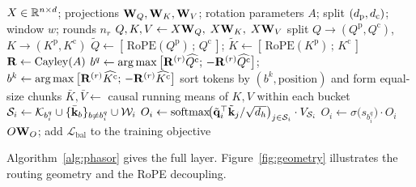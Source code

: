 \begin{algorithm}[t]
\caption{PHASOR attention (single head, causal)}
\label{alg:phasor}
\begin{algorithmic}[1]
\Require $X \in \mathbb{R}^{n\times d}$; projections $\mathbf{W}_Q,\mathbf{W}_K,\mathbf{W}_V$; rotation parameters $A$; split $(d_{\mathrm{p}},d_{\mathrm{c}})$; window $w$; rounds $n_r$
\State $Q, K, V \gets X\mathbf{W}_Q,\; X\mathbf{W}_K,\; X\mathbf{W}_V$
\State split $Q \to (Q^{\mathrm p}, Q^{\mathrm c})$, $K \to (K^{\mathrm p}, K^{\mathrm c})$ 
\State $\tilde Q \gets [\,\mathrm{RoPE}(Q^{\mathrm p})\,;\,Q^{\mathrm c}\,]$; \quad $\tilde K \gets [\,\mathrm{RoPE}(K^{\mathrm p})\,;\,K^{\mathrm c}\,]$
\State $\mathbf{R} \gets \mathrm{Cayley}(A)$ 
  \State $b^q \gets \arg\max\big[\mathbf{R}^{(r)}\widehat{Q^{\mathrm c}};\,-\mathbf{R}^{(r)}\widehat{Q^{\mathrm c}}\big]$; \quad $b^k \gets \arg\max\big[\mathbf{R}^{(r)}\widehat{K^{\mathrm c}};\,-\mathbf{R}^{(r)}\widehat{K^{\mathrm c}}\big]$
  \State sort tokens by $(b^k, \text{position})$ and form equal-size chunks 
\EndFor
\State $\bar K, \bar V \gets$ causal running means of $K,V$ within each bucket 
  \State $\mathcal S_i \gets \mathcal K_{b^q_i} \cup \{\bar{\mathbf{k}}_b\}_{b \neq b^q_i} \cup \mathcal W_i$ 
  \State $O_i \gets \mathrm{softmax}\!\big(\tilde{\mathbf{q}}_i^\top \tilde{\mathbf{k}}_j / \sqrt{d_h}\big)_{j \in \mathcal S_i} \cdot V_{\mathcal S_i}$
  \State $O_i \gets \sigma\!\big(s_{b^q_i}\big)\cdot O_i$ 
\EndFor
\State \Return $O\mathbf{W}_O$; \quad add $\mathcal L_{\text{bal}}$ to the training objective
\end{algorithmic}
\end{algorithm}

Algorithm~\ref{alg:phasor} gives the full layer. Figure~\ref{fig:geometry} illustrates the routing geometry and the RoPE decoupling.

